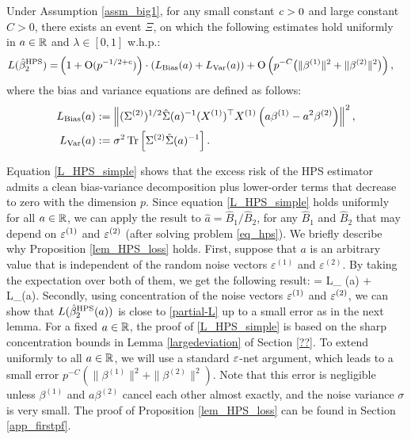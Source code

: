 \begin{proposition}\label{lem_HPS_loss}
     Under Assumption \ref{assm_big1}, for any small constant ${\mathit{c}}>0$ and large constant $C>0$, there exists an event $\Xi$, on which the following estimates hold uniformly in $a\in \mathbb{R}$ and $\lambda\in [0,1]$ w.h.p.:
    \begin{align}
        L(\hat{\beta}_2^{\MTL}) =& \left( 1+ \OO(p^{-1/2+c})\right)\cdot \left(L_{\bias} (a) + L_{\var}(a)\right) %
        + \OO \left( p^{-C}\big( \|\beta^{(1)} \|^2  +  \|\beta^{(2)} \|^2\big)   \right), \label{L_HPS_simple}
    \end{align}
    where the bias and variance equations are defined as follows:
    \begin{align}
        L_{\textup{Bias}} (a) &:= \left\| (\Sigma^{(2)})^{1/2}\hat \Sigma(a)^{-1} (X^{(1)})^\top X^{(1)} \left(a\beta^{(1)}- a^2\beta^{(2)}\right) \right\|^2,  \label{Lbias} \\
        L_{\operatorname{Var}}(a)   &:= \sigma^2  \operatorname{Tr}\left[{\Sigma^{(2)}\hat \Sigma(a)^{-1}  }\right].  \label{Lvar}
    \end{align}
\end{proposition}



Equation \eqref{L_HPS_simple} shows that the excess risk of the HPS estimator admits a clean bias-variance decomposition plus lower-order terms that decrease to zero with the dimension $p$.
Since equation \eqref{L_HPS_simple} holds uniformly for all $a\in \mathbb{R}$, we can apply the result to $\hat a = \hat{B}_1 / \hat{B}_2$, for any $\hat{B}_1$ and $\hat{B}_2$ that may depend on ${\varepsilon}^{(1)}$ and ${\varepsilon}^{(2)}$ (after solving problem \eqref{eq_hps}).
We briefly describe why Proposition \ref{lem_HPS_loss} holds.
First, suppose that $a$ is an arbitrary value that is independent of the random noise vectors $\varepsilon^{(1)}$ and $\varepsilon^{(2)}$.
By taking the expectation over both of them, we get the following result:
\be\label{partial-L}
     = L_{\bias} (\hat a) + L_{\var}(\hat a).
\ee
Secondly, using concentration of the noise vectors ${\varepsilon}^{(1)}$ and ${\varepsilon}^{(2)}$, we can show that $L(\hat{\beta}_2^{\textup{HPS}}(a))$ is close to \eqref{partial-L} up to a small error as in the next lemma.
For a fixed $a\in \mathbb{R}$, the proof of \eqref{L_HPS_simple} is based on the sharp concentration bounds in Lemma \ref{largedeviation} of Section \ref{??}.
To extend uniformly to all $a\in \mathbb{R}$, we will use a standard ${\varepsilon}$-net argument, which leads to a small error $ p^{-C}\left( \|\beta^{(1)} \|^2  +  \|\beta^{(2)} \|^2\right) $. Note that this error is negligible unless $\beta^{(1)}$ and $ a\beta^{(2)}$ cancel each other almost exactly, and the noise variance $\sigma$ is very small.
The proof of Proposition \ref{lem_HPS_loss} can be found in Section  \ref{app_firstpf}.

